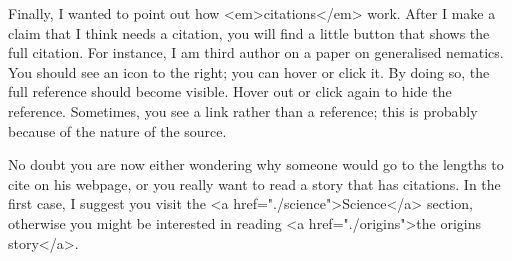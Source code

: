 Finally, I wanted to point out how <em>citations</em> work. After I make a claim that I think needs a citation, you will find a little button
that shows the full citation. For instance, I am third author on a paper on generalised nematics. You should see an icon to the right;
you can hover or click it. By doing so, the full reference should become visible. Hover out or click again to hide the reference. Sometimes, you
see a link rather than a reference; this is probably because of the nature of the source.

No doubt you are now either wondering why someone would go to the lengths to cite on his webpage, or you really want to read a story that has
citations. In the first case, I suggest you visit the <a href="./science">Science</a> section, otherwise you might be interested in reading
<a href="./origins">the origins story</a>.
